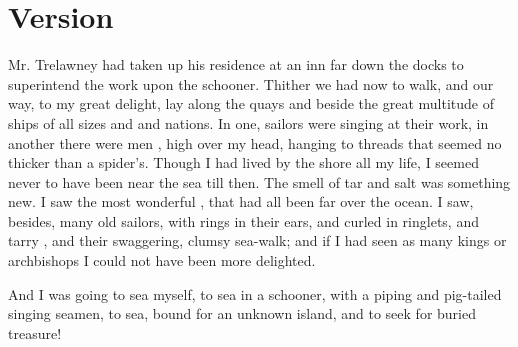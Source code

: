 \documentclass{fiche}
\begin{document}
\newpage
\section{Version}

\begin{version}
Mr. Trelawney had taken up his residence at an inn far down the docks to superintend the work
upon the schooner. Thither we had now to walk, and our way, to my great delight, lay along
the quays and beside the great multitude of ships of all sizes and
 and nations. In one, sailors were singing at their work, in
another there were men , high over my head, hanging
to threads that seemed no thicker than a spider's. Though I had lived by the shore all my
life, I seemed never to have been near the sea till then. The smell of tar and salt was
something new. I saw the most wonderful ,
that had all been far over the ocean. I saw, besides, many old sailors, with rings in their
ears, and  curled in ringlets, and tarry
, and their swaggering, clumsy
sea-walk; and if I had seen as many kings or archbishops I could not have been more
delighted.

And I was going to sea myself, to sea in a schooner, with a piping
 and pig-tailed singing seamen, to sea,
bound for an unknown island, and to seek for buried treasure!
\end{version}

\end{document}
